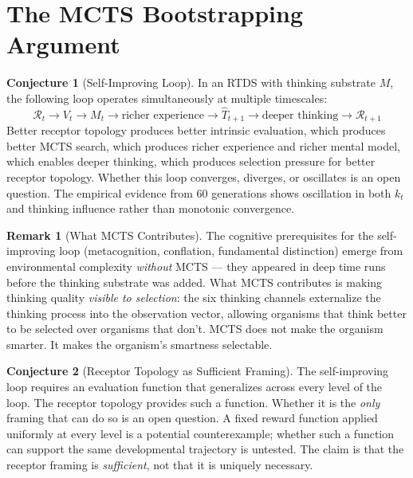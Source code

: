 \documentclass[12pt]{article}
\theoremstyle{definition}
\newtheorem{remark}{Remark}
\newtheorem{conjecture}{Conjecture}
\begin{document}
\section{The MCTS Bootstrapping Argument}

\begin{conjecture}[Self-Improving Loop]
In an RTDS with thinking substrate $M$, the following loop operates simultaneously
at multiple timescales:
\[
\mathcal{R}_t \to V_t \to M_t \to \text{richer experience} \to \hat{T}_{t+1}
\to \text{deeper thinking} \to \mathcal{R}_{t+1}
\]
Better receptor topology produces better intrinsic evaluation, which produces better
MCTS search, which produces richer experience and richer mental model, which enables
deeper thinking, which produces selection pressure for better receptor topology.
Whether this loop converges, diverges, or oscillates is an open question. The empirical
evidence from 60 generations shows oscillation in both $k_t$ and thinking influence
rather than monotonic convergence.
\end{conjecture}

\begin{remark}[What MCTS Contributes]
The cognitive prerequisites for the self-improving loop (metacognition, conflation,
fundamental distinction) emerge from environmental complexity \emph{without} MCTS ---
they appeared in deep time runs before the thinking substrate was added. What MCTS
contributes is making thinking quality \emph{visible to selection}: the six thinking
channels externalize the thinking process into the observation vector, allowing
organisms that think better to be selected over organisms that don't. MCTS does not
make the organism smarter. It makes the organism's smartness selectable.
\end{remark}

\begin{conjecture}[Receptor Topology as Sufficient Framing]
The self-improving loop requires an evaluation function that generalizes across every
level of the loop. The receptor topology provides such a function. Whether it is the
\emph{only} framing that can do so is an open question. A fixed reward function applied
uniformly at every level is a potential counterexample; whether such a function can
support the same developmental trajectory is untested. The claim is that the receptor
framing is \emph{sufficient}, not that it is uniquely necessary.
\end{conjecture}
\end{document}
